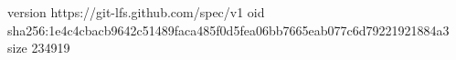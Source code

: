 version https://git-lfs.github.com/spec/v1
oid sha256:1e4c4cbacb9642c51489faca485f0d5fea06bb7665eab077c6d79221921884a3
size 234919
